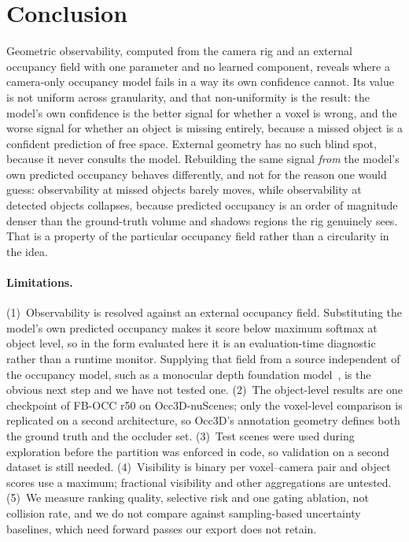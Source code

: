 \documentclass[10pt,twocolumn,letterpaper]{article}
\begin{document}


\section{Conclusion}
Geometric observability, computed from the camera rig and an external
occupancy field with one parameter and no learned component, reveals where
a camera-only occupancy model fails in a way its own confidence cannot.
Its value is not uniform across granularity, and that non-uniformity is the
result: the model's own confidence is the better signal for whether a voxel
is wrong, and the worse signal for whether an object is missing entirely,
because a missed object is a confident prediction of free space. External
geometry has no such blind spot, because it never consults the model.
Rebuilding the same signal \emph{from} the model's own predicted occupancy
behaves differently, and not for the reason one would guess: observability
at missed objects barely moves, while observability at detected objects
collapses, because predicted occupancy is an order of magnitude denser than
the ground-truth volume and shadows regions the rig genuinely sees. That is
a property of the particular occupancy field rather than a circularity in
the idea.

\paragraph{Limitations.}
(1)~Observability is resolved against an external occupancy field.
Substituting the model's own predicted occupancy makes it score below
maximum softmax at object level, so in the form evaluated here it is an
evaluation-time diagnostic rather than a runtime monitor. Supplying that
field from a source independent of the occupancy model, such as a monocular
depth foundation model~\cite{bochkovskii2024depthpro, hu2024metric3dv2}, is
the obvious next step and we have not tested one.
(2)~The object-level results are one checkpoint of FB-OCC r50 on
Occ3D-nuScenes; only the voxel-level comparison is replicated on a second
architecture, so Occ3D's annotation geometry defines both the ground truth
and the occluder set.
(3)~Test scenes were used during exploration before the partition was
enforced in code, so validation on a second dataset is still needed.
(4)~Visibility is binary per voxel--camera pair and object scores use a
maximum; fractional visibility and other aggregations are untested.
(5)~We measure ranking quality, selective risk and one gating ablation, not
collision rate, and we do not compare against sampling-based uncertainty
baselines, which need forward passes our export does not retain.
\end{document}
